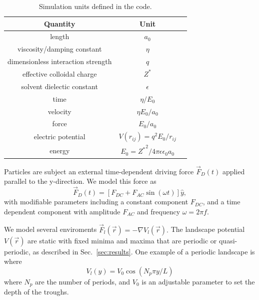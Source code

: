 \documentclass[prb,preprint]{revtex4}
\begin{document}
\begin{table}[h!]
\centering
\caption{Simulation units defined in the code.}
\begin{ruledtabular}
\begin{tabular}{c c p{5cm}}
Quantity & Unit \\
\hline
length &  $a_0$ \\
viscosity/damping constant & $\eta$ \\
dimensionless interaction strength & $q$ \\
effective colloidal charge & $Z^*$ \\
solvent dielectic constant & $\epsilon$ \\
time &  $\eta / E_0$ \\
velocity &  $\eta E_0 / a_0$ \\
force & $E_0 / a_0$\\
electric potential & $V(r_{ij}) = q^2 E_0/r_{ij}$ \\
energy & $E_0 = {Z^*}^2/4\pi \epsilon \epsilon_0 a_0$ \\
\end{tabular}
\end{ruledtabular}
\label{tab:1}
\end{table}

Particles are subject an external time-dependent driving force
$\vec{F}_{D}(t)$
applied parallel to the y-direction.
We model this force as
\begin{equation}
\vec{F}_{D}(t) = [F_{DC} + F_{AC} \sin(\omega t)] \hat{y},
\end{equation}
with modifiable parameters including
a constant component $F_{DC}$,
and a time dependent component with amplitude $F_{AC}$
and frequency $\omega = 2 \pi f$.

 We model several enviroments
 $\vec{F}_{l}(\vec{r}) = -\nabla V_l(\vec{r}).$
 The landscape potential $V(\vec{r}) $ are static 
 with fixed minima and maxima
 that are periodic or quasi-periodic,
 as described in Sec.~\ref{sec:results}. 
 One example of a periodic landscape is
 where 
 \begin{equation}
   V_l(y) = V_0 \cos{(N_p \pi y / L)}
 \end{equation}
 where $N_p$ are the number of periods,
 and $V_0$ is an adjustable parameter
 to set the depth of the troughs.
\end{document}
